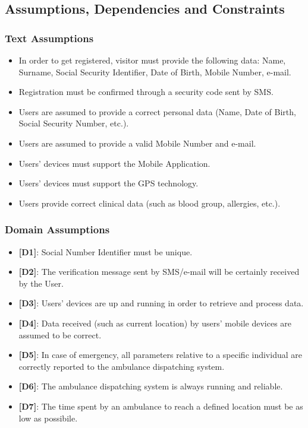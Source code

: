 \documentclass[12pt,a4paper]{article}
\begin{document}
		\subsection{Assumptions, Dependencies and Constraints}
			\subsubsection{Text Assumptions}
			\begin{itemize}
				\item In order to get registered, visitor must provide the following data: Name, Surname, Social Security Identifier, Date of Birth, Mobile Number, e-mail.
				\item Registration must be confirmed through a security code sent by SMS.
				\item Users are assumed to provide a correct personal data (Name, Date of Birth, Social Security Number, etc.).
				\item Users are assumed to provide a valid Mobile Number and e-mail.
				\item Users' devices must support the Mobile Application.
				\item Users' devices must support the GPS technology.
				\item Users provide correct clinical data (such as blood group, allergies, etc.).
			\end{itemize}
			\subsubsection{Domain Assumptions}
			\begin{itemize} 
				\item {\textbf[}\textbf{D1}{\textbf]}: Social Number Identifier must be unique.
				\item {\textbf[}\textbf{D2}{\textbf]}: The verification message sent by SMS/e-mail will be certainly received by the User.
		        \item {\textbf[}\textbf{D3}{\textbf]}: Users' devices are up and running in order to retrieve and process data. 
		        \item {\textbf[}\textbf{D4}{\textbf]}: Data received (such as current location) by users' mobile devices are assumed to be correct.
		        \item {\textbf[}\textbf{D5}{\textbf]}: In case of emergency, all parameters relative to a specific individual are correctly reported to the ambulance dispatching system.
		        \item {\textbf[}\textbf{D6}{\textbf]}: The ambulance dispatching system is always running and reliable.
		        \item {\textbf[}\textbf{D7}{\textbf]}: The time spent by an ambulance to reach a defined location must be as low as possibile.
			\end{itemize}
\end{document}
